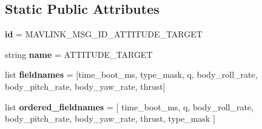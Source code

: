 \subsection*{Static Public Attributes}
\begin{DoxyCompactItemize}
\item 
\mbox{\label{classpymavlink_1_1dialects_1_1v10_1_1MAVLink__attitude__target__message_ac8dbdc0d4643d641168a25e4c0422cac}} 
{\bfseries id} = M\+A\+V\+L\+I\+N\+K\+\_\+\+M\+S\+G\+\_\+\+I\+D\+\_\+\+A\+T\+T\+I\+T\+U\+D\+E\+\_\+\+T\+A\+R\+G\+ET
\item 
\mbox{\label{classpymavlink_1_1dialects_1_1v10_1_1MAVLink__attitude__target__message_af44e9c293e3885b4c690a697939a0e45}} 
string {\bfseries name} = \textquotesingle{}A\+T\+T\+I\+T\+U\+D\+E\+\_\+\+T\+A\+R\+G\+ET\textquotesingle{}
\item 
\mbox{\label{classpymavlink_1_1dialects_1_1v10_1_1MAVLink__attitude__target__message_af89398db8ded0ce1d2d331bdfd65f6c5}} 
list {\bfseries fieldnames} = \mbox{[}\textquotesingle{}time\+\_\+boot\+\_\+ms\textquotesingle{}, \textquotesingle{}type\+\_\+mask\textquotesingle{}, \textquotesingle{}q\textquotesingle{}, \textquotesingle{}body\+\_\+roll\+\_\+rate\textquotesingle{}, \textquotesingle{}body\+\_\+pitch\+\_\+rate\textquotesingle{}, \textquotesingle{}body\+\_\+yaw\+\_\+rate\textquotesingle{}, \textquotesingle{}thrust\textquotesingle{}\mbox{]}
\item 
\mbox{\label{classpymavlink_1_1dialects_1_1v10_1_1MAVLink__attitude__target__message_ad7990393823bc2307b282bb66b27cca8}} 
list {\bfseries ordered\+\_\+fieldnames} = \mbox{[} \textquotesingle{}time\+\_\+boot\+\_\+ms\textquotesingle{}, \textquotesingle{}q\textquotesingle{}, \textquotesingle{}body\+\_\+roll\+\_\+rate\textquotesingle{}, \textquotesingle{}body\+\_\+pitch\+\_\+rate\textquotesingle{}, \textquotesingle{}body\+\_\+yaw\+\_\+rate\textquotesingle{}, \textquotesingle{}thrust\textquotesingle{}, \textquotesingle{}type\+\_\+mask\textquotesingle{} \mbox{]}
\item 
\mbox{\label{classpymavlink_1_1dialects_1_1v10_1_1MAVLink__attitude__target__message_a8ee478ca53359f0486639fb4d19074e2}} 

\end{DoxyCompactItemize}
